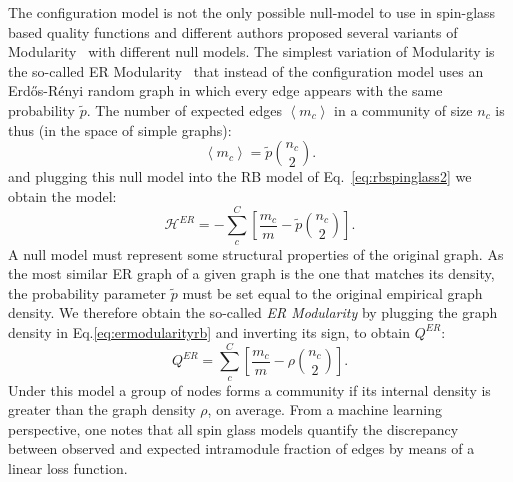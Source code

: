 The configuration model is not the only possible null-model to use in spin-glass based quality functions and different authors proposed several variants of Modularity~\cite{ronhovde2010,ronhovde2009,traag2011} with different null models.
The simplest variation of Modularity is the so-called ER Modularity~\cite{traag2015} that instead of the configuration model uses an Erd\H{o}s-Rényi random graph in which every edge appears with the same probability $\tilde{p}$. The number of expected edges $\left< m_c \right>$ in a community of size $n_c$ is thus (in the space of simple graphs):
\begin{equation}
\left< m_c \right> = \tilde{p}\binom{n_c}{2}.
\end{equation}
and plugging this null model into the RB model of Eq.~\ref{eq:rbspinglass2} we obtain the model:
\begin{equation}\label{eq:ermodularityrb}
\mathcal{H}^{ER} = -\sum \limits_c^C \left[\frac{m_c}{m}  - \tilde{p}\binom{n_c}{2} \right].
\end{equation}
A null model must represent some structural properties of the original graph. As the most similar ER graph of a given graph is the one that matches its density, the probability parameter $\tilde{p}$ must be set equal to the original empirical graph density. We therefore obtain the so-called \emph{ER Modularity} by plugging the graph density in Eq.\ref{eq:ermodularityrb} and inverting its sign, to obtain $Q^{ER}$: 
\begin{equation}
Q^{ER} = \sum \limits_c^C \left[\frac{m_c}{m}  - \rho \binom{n_c}{2} \right].
\end{equation}
Under this model a group of nodes forms a community if its internal density is greater than the graph density $\rho$, on average.
From a machine learning perspective, one notes that all spin glass models quantify the discrepancy between observed and expected intramodule fraction of edges by means of a linear loss function.



